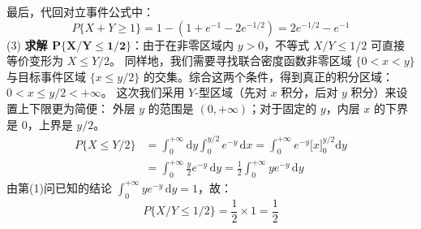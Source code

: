 ﻿\documentclass[lang=cn,11pt]{elegantbook}
\begin{document}
\begin{solution}
最后，代回对立事件公式中：
\[
P\{X+Y \geqslant 1\} = 1 - \left( 1 + e^{-1} - 2e^{-1/2} \right) = 2e^{-1/2} - e^{-1}
\]
(3) \textbf{求解 $\boldsymbol{P\{X/Y \leqslant 1/2\}}$}：由于在非零区域内 $y > 0$，不等式 $X/Y \leqslant 1/2$ 可直接等价变形为 $X \leqslant Y/2$。
同样地，我们需要寻找联合密度函数非零区域 $\{0 < x < y\}$ 与目标事件区域 $\{x \leqslant y/2\}$ 的交集。综合这两个条件，得到真正的积分区域：$0 < x \leqslant y/2 < +\infty$。
这次我们采用 $Y$-型区域（先对 $x$ 积分，后对 $y$ 积分）来设置上下限更为简便：
外层 $y$ 的范围是 $(0, +\infty)$；对于固定的 $y$，内层 $x$ 的下界是 $0$，上界是 $y/2$。
\begin{align*}
P\{X \leqslant Y/2\} &= \int_{0}^{+\infty} \mathrm{d}y \int_{0}^{y/2} e^{-y} \,\mathrm{d}x = \int_{0}^{+\infty} e^{-y} \Big[ x \Big]_{0}^{y/2} \mathrm{d}y \\
&= \int_{0}^{+\infty} \frac{y}{2} e^{-y} \,\mathrm{d}y = \frac{1}{2} \int_{0}^{+\infty} y e^{-y} \,\mathrm{d}y
\end{align*}
由第(1)问已知的结论 $\int_{0}^{+\infty} y e^{-y} \,\mathrm{d}y = 1$，故：
\[
P\{X/Y \leqslant 1/2\} = \frac{1}{2} \times 1 = \frac{1}{2}
\]
\end{solution}
\end{document}
